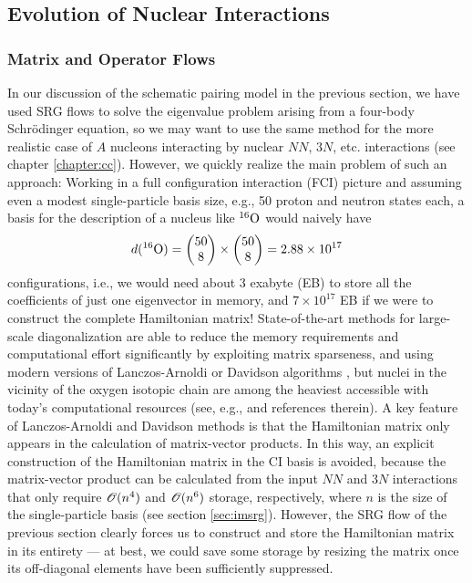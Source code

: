 \subsection{Evolution of Nuclear Interactions}

%
%
\subsubsection{\label{sec:srg_opflow}Matrix and Operator Flows}
In our discussion of the schematic pairing model in the previous section, we 
have used SRG flows to solve the eigenvalue problem arising from a four-body 
Schr\"odinger equation, so we may want to use the same method for the more 
realistic case of $A$ nucleons interacting by nuclear $NN$, $3N$, etc. 
interactions (see chapter \ref{chapter:cc}). However, we quickly realize the
main problem of such an approach: Working in a full configuration interaction (FCI) 
picture
and assuming even a modest single-particle basis size, e.g., 50 proton and neutron 
states each, a basis for the description of a nucleus like $\nuc{O}{16}$ would 
naively have
\begin{equation}
 d(\nuc{O}{16}) = \begin{pmatrix} 50 \\ 8\end{pmatrix} \times 
           \begin{pmatrix} 50 \\ 8\end{pmatrix}
                = 2.88\times10^{17}
\end{equation}
configurations, i.e., we would need about 3 exabyte (EB) to store all the coefficients
of just one eigenvector in memory, and $7\times10^{17}$ EB if we were to construct
the complete Hamiltonian matrix! State-of-the-art methods for large-scale 
diagonalization are able to reduce the memory requirements and computational
effort significantly by exploiting matrix sparseness, and using modern versions of
Lanczos-Arnoldi \cite{Lanczos:1950sp,Arnoldi:1951kk} or Davidson algorithms 
\cite{Davidson:1989pi}, but nuclei in the vicinity of the oxygen isotopic 
chain are among the heaviest accessible with today's computational
resources (see, e.g., \cite{Yang:2013ly,Barrett:2013oq} and references therein).
A key feature of Lanczos-Arnoldi and Davidson methods is that the
Hamiltonian matrix only appears in the calculation
of matrix-vector products. In this way, an explicit construction of the Hamiltonian
matrix in the CI basis is avoided, because the matrix-vector product can be
calculated from the input $NN$ and $3N$ interactions that only require $\OC(n^4)$ 
and $\OC(n^6)$ storage, respectively, where $n$ is the size of the single-particle
basis (see section \ref{sec:imsrg}). However, the SRG flow of the previous section 
clearly forces us to construct
and store the Hamiltonian matrix in its entirety --- at best, we could save some
storage by resizing the matrix once its off-diagonal elements have been 
sufficiently suppressed.

